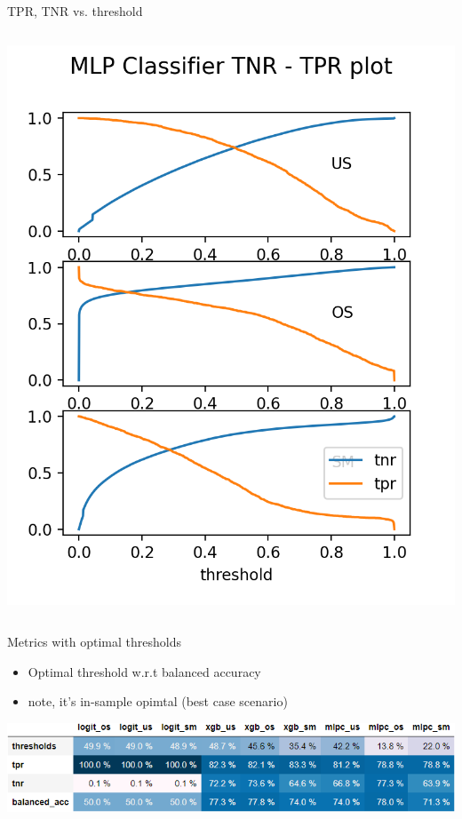 \documentclass{beamer}
\begin{document}
\begin{frame}{TPR, TNR vs. threshold}
\begin{columns}
\begin{column}{.5\textwidth}
\begin{center}
        \includegraphics[scale=0.55]{img/mlpc_tnr_tpr.png}
		\end{center}
    \end{column}%
    
\end{columns}

\end{frame}

\begin{frame}{Metrics with optimal thresholds}

\begin{itemize}
\item Optimal threshold w.r.t balanced accuracy
\item note, it's in-sample opimtal (best case scenario)
\end{itemize}

\begin{center}
\includegraphics[scale=0.6]{img/max_balance_table.png}
\end{center}
\end{frame}
\end{document}
